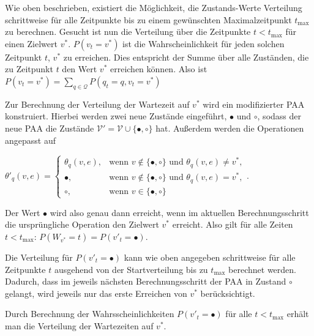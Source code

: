 Wie oben beschrieben, existiert die Möglichkeit, die Zustands-Werte Verteilung schrittweise für alle Zeitpunkte bis zu einem gewünschten Maximalzeitpunkt $t_{\text{max}}$ zu berechnen.
Gesucht ist nun die Verteilung über die Zeitpunkte $t < t_{\text{max}}$ für einen Zielwert $v^*$. $P(v_{t} = v^*)$ ist die Wahrscheinlichkeit für jeden solchen Zeitpunkt $t$, $v^*$  zu erreichen. Dies entspricht der Summe über alle Zuständen, die zu Zeitpunkt $t$ den Wert $v^*$ erreichen können. Also ist $P(v_t = v^*)  = \sum_{q \in \mathcal{Q}} P(q_{t} = q, v_{t} = v^*)$


Zur Berechnung der Verteilung der Wartezeit auf $v^*$ wird ein modifizierter PAA konstruiert. Hierbei werden zwei neue Zustände eingeführt, $\bullet$ und $\circ$, sodass der neue PAA die Zustände $\mathcal{V}' = \mathcal{V} \cup \{\bullet, \circ\}$ hat. Außerdem werden die Operationen angepasst auf

$ \theta'_q(v,e)=
\begin{cases}
\theta_q(v,e), 	& \text{wenn } v \notin \{\bullet, \circ\} \text{ und } \theta_q(v,e) \neq v^* ,\\
\bullet,	& \text{wenn } v \notin \{\bullet, \circ\} \text{ und } \theta_q(v,e) = v^* ,  \\
\circ, 		& \text{wenn } v \in \{\bullet, \circ\}
\end{cases}$.

Der Wert $\bullet$ wird also genau dann erreicht, wenn im aktuellen Berechnungsschritt die ursprüngliche Operation den Zielwert $v^*$ erreicht. Also gilt für alle Zeiten $t < t_{\text{max}}$: $P(W_{v^*} = t) = P(v'_t = \bullet)$.

Die Verteilung für $P(v'_{t} = \bullet)$ kann wie oben angegeben schrittweise für alle Zeitpunkte $t$ ausgehend von der Startverteilung bis zu $t_{\text{max}}$ berechnet werden. Dadurch, dass im jeweils nächsten Berechnungsschritt der PAA in Zustand $\circ$ gelangt, wird jeweils nur das erste Erreichen von $v^*$ berücksichtigt.

Durch Berechnung der Wahrsscheinlichkeiten $P(v'_{t} = \bullet)$ für alle $t < t_{\text{max}}$ erhält man die Verteilung der Wartezeiten auf $v^*$.


